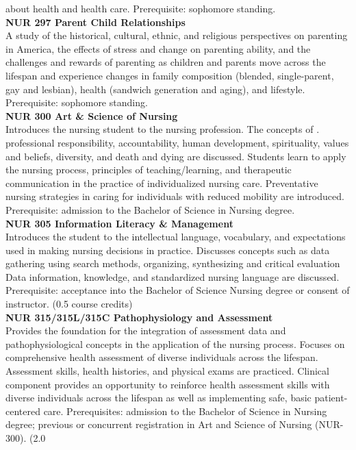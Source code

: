 \documentclass[
  letterpaper,
]{scrbook}
\begin{document}
about health and health care. Prerequisite: sophomore standing.\\
\textbf{NUR 297 Parent Child Relationships}\\
A study of the historical, cultural, ethnic, and religious perspectives
on parenting in America, the effects of stress and change on parenting
ability, and the challenges and rewards of parenting as children and
parents move across the lifespan and experience changes in family
composition (blended, single-parent, gay and lesbian), health (sandwich
generation and aging), and lifestyle. Prerequisite: sophomore
standing.\\
\textbf{NUR 300 Art \& Science of Nursing}\\
Introduces the nursing student to the nursing profession. The concepts
of . professional responsibility, accountability, human development,
spirituality, values and beliefs, diversity, and death and dying are
discussed. Students learn to apply the nursing process, principles of
teaching/learning, and therapeutic communication in the practice of
individualized nursing care. Preventative nursing strategies in caring
for individuals with reduced mobility are introduced. Prerequisite:
admission to the Bachelor of Science in Nursing degree.\\
\textbf{NUR 305 Information Literacy \& Management}\\
Introduces the student to the intellectual language, vocabulary, and
expectations used in making nursing decisions in practice. Discusses
concepts such as data gathering using search methods, organizing,
synthesizing and critical evaluation Data information, knowledge, and
standardized nursing language are discussed. Prerequisite: acceptance
into the Bachelor of Science Nursing degree or consent of instructor.
(0.5 course credits)\\
\textbf{NUR 315/315L/315C Pathophysiology and Assessment}\\
Provides the foundation for the integration of assessment data and
pathophysiological concepts in the application of the nursing process.
Focuses on comprehensive health assessment of diverse individuals across
the lifespan. Assessment skills, health histories, and physical exams
are practiced. Clinical component provides an opportunity to reinforce
health assessment skills with diverse individuals across the lifespan as
well as implementing safe, basic patient-centered care. Prerequisites:
admission to the Bachelor of Science in Nursing degree; previous or
concurrent registration in Art and Science of Nursing (NUR-300). (2.0
\end{document}
